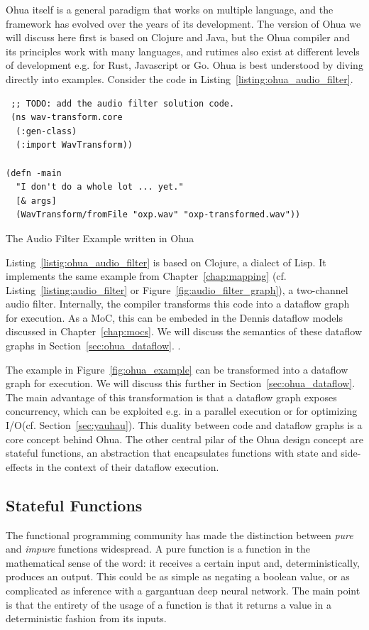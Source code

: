 Ohua itself is a general paradigm that works on multiple language, and the framework has evolved over the years of its development.
The version of Ohua we will discuss here first is based on Clojure and Java, but the Ohua compiler and its principles work with many languages,
and rutimes also exist at different levels of development e.g. for Rust, Javascript or Go.
Ohua is best understood by diving directly into examples. Consider the code in Listing~\ref{listing:ohua_audio_filter}.

\begin{listing}
\begin{verbatim}
 ;; TODO: add the audio filter solution code.
 (ns wav-transform.core
  (:gen-class)
  (:import WavTransform))

(defn -main
  "I don't do a whole lot ... yet."
  [& args]
  (WavTransform/fromFile "oxp.wav" "oxp-transformed.wav")) 
\end{verbatim}
\caption{The Audio Filter Example written in Ohua}
\label{listing:ohua_audio_filter}
\end{listing}

Listing~\ref{listig:ohua_audio_filter} is based on Clojure, a dialect of Lisp.
It implements the same example from Chapter~\ref{chap:mapping} (cf. Listing~\ref{listing:audio_filter} or Figure~\ref{fig:audio_filter_graph}), a two-channel audio filter.
Internally, the compiler transforms this code into a dataflow graph for execution.
As a \ac{MoC}, this can be embeded in the Dennis dataflow models discussed in Chapter~\ref{chap:mocs}.
We will discuss the semantics of these dataflow graphs in Section~\ref{sec:ohua_dataflow}.
.

The example in Figure~\ref{fig:ohua_example} can be transformed into a dataflow graph for execution. We will discuss this further in Section~\ref{sec:ohua_dataflow}.
The main advantage of this transformation is that a dataflow graph exposes concurrency, which can be exploited e.g. in a parallel execution or for optimizing \ac{I/O}(cf. Section~\ref{sec:yauhau}).
This duality between code and dataflow graphs is a core concept behind Ohua.
The other central pilar of the Ohua design concept are stateful functions, an abstraction that encapsulates functions with state and side-effects in the context of their dataflow execution.

\subsection{Stateful Functions}
The functional programming community has made the distinction between \emph{pure} and \emph{impure} functions widespread.
A pure function is a function in the mathematical sense of the word: it receives a certain input and, deterministically, produces an output.
This could be as simple as negating a boolean value, or as complicated as inference with a gargantuan deep neural network.
The main point is that the entirety of the usage of a function is that it returns a value in a deterministic fashion from its inputs.

